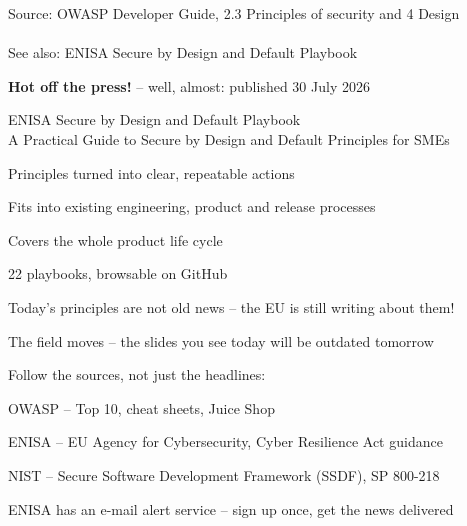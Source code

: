 \documentclass[Screen16to9,17pt]{foils}
\begin{document}
Source: OWASP Developer Guide, 2.3 Principles of security and 4 Design\\
{\footnotesize{}}\\
See also: ENISA Secure by Design and Default Playbook




{\bfseries\Large Hot off the press!} -- well, almost: published 30 July 2026

\begin{list1}
\item ENISA Secure by Design and Default Playbook\\
A Practical Guide to Secure by Design and Default Principles for SMEs
\begin{list2}
\item Principles turned into clear, repeatable actions
\item Fits into existing engineering, product and release processes
\item Covers the whole product life cycle
\item 22 playbooks, browsable on GitHub
\end{list2}
\item {\footnotesize{}}
\item {\footnotesize{}}
\end{list1}

Today's principles are not old news -- the EU is still writing about them!


\begin{list1}
\item The field moves -- the slides you see today will be outdated tomorrow
\item Follow the sources, not just the headlines:
\begin{list2}
\item OWASP -- Top 10, cheat sheets, Juice Shop\\
{\footnotesize{}}
\item ENISA -- EU Agency for Cybersecurity, Cyber Resilience Act guidance\\
{\footnotesize{}}
\item NIST -- Secure Software Development Framework (SSDF), SP 800-218\\
{\footnotesize{}}
\end{list2}
\item ENISA has an e-mail alert service -- sign up once, get the news delivered\\
{\footnotesize{}}
\end{list1}
\end{document}
